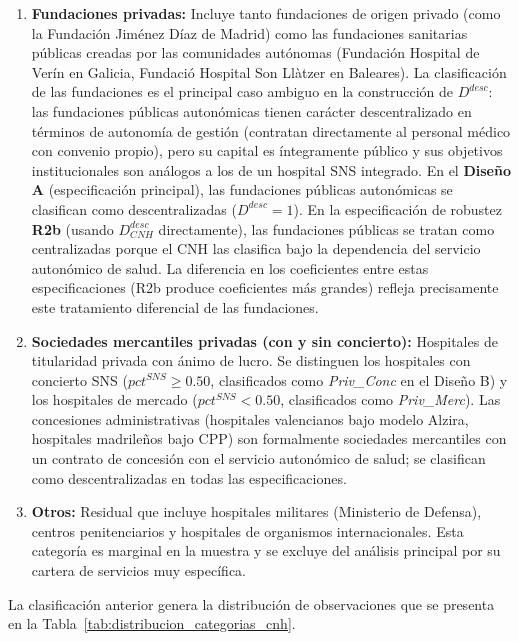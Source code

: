 \documentclass[12pt, a4paper, twoside, openright]{book}
\theoremstyle{plain}
\theoremstyle{definition}
\theoremstyle{remark}
\begin{document}
\begin{enumerate}[label=(\roman*)]
  \item \textbf{Fundaciones privadas:} Incluye tanto fundaciones de origen privado (como la Fundación Jiménez Díaz de Madrid) como las fundaciones sanitarias públicas creadas por las comunidades autónomas (Fundación Hospital de Verín en Galicia, Fundació Hospital Son Llàtzer en Baleares). La clasificación de las fundaciones es el principal caso ambiguo en la construcción de $D^{desc}$: las fundaciones públicas autonómicas tienen carácter descentralizado en términos de autonomía de gestión (contratan directamente al personal médico con convenio propio), pero su capital es íntegramente público y sus objetivos institucionales son análogos a los de un hospital SNS integrado. En el \textbf{Diseño A} (especificación principal), las fundaciones públicas autonómicas se clasifican como descentralizadas ($D^{desc}=1$). En la especificación de robustez \textbf{R2b} (usando $D^{desc}_{CNH}$ directamente), las fundaciones públicas se tratan como centralizadas porque el CNH las clasifica bajo la dependencia del servicio autonómico de salud. La diferencia en los coeficientes entre estas especificaciones (R2b produce coeficientes más grandes) refleja precisamente este tratamiento diferencial de las fundaciones.

  \item \textbf{Sociedades mercantiles privadas (con y sin concierto):} Hospitales de titularidad privada con ánimo de lucro. Se distinguen los hospitales con concierto SNS ($pct^{SNS}\geq 0.50$, clasificados como \textit{Priv\_Conc} en el Diseño B) y los hospitales de mercado ($pct^{SNS}<0.50$, clasificados como \textit{Priv\_Merc}). Las concesiones administrativas (hospitales valencianos bajo modelo Alzira, hospitales madrileños bajo CPP) son formalmente sociedades mercantiles con un contrato de concesión con el servicio autonómico de salud; se clasifican como descentralizadas en todas las especificaciones.

  \item \textbf{Otros:} Residual que incluye hospitales militares (Ministerio de Defensa), centros penitenciarios y hospitales de organismos internacionales. Esta categoría es marginal en la muestra y se excluye del análisis principal por su cartera de servicios muy específica.
\end{enumerate}

La clasificación anterior genera la distribución de observaciones que se presenta en la Tabla~\ref{tab:distribucion_categorias_cnh}.
\end{document}

